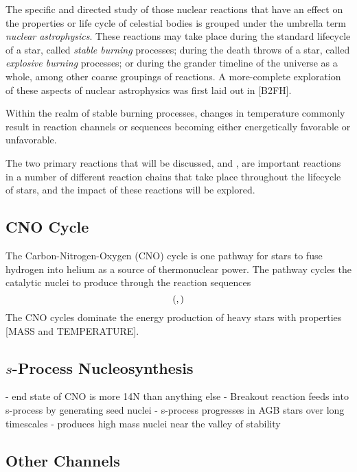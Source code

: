 

The specific and directed study of those nuclear reactions that have an effect
on the properties or life cycle of celestial bodies is grouped under the
umbrella term \emph{nuclear astrophysics}. These reactions may take place
during the standard lifecycle of a star, called \emph{stable burning}
processes; during the death throws of a star, called \emph{explosive burning}
processes; or during the grander timeline of the universe as a whole, among
other coarse groupings of reactions. A more-complete exploration of these
aspects of nuclear astrophysics was first laid out in [B2FH].

Within the realm of stable burning processes, changes in temperature commonly
result in reaction channels or sequences becoming either energetically
favorable or unfavorable.

The two primary reactions that will
be discussed, \alpa{} and ,
are important reactions in a number of different reaction chains that take
place throughout the lifecycle of stars, and the impact of these reactions will
be explored.

\subsection{CNO Cycle}

The Carbon-Nitrogen-Oxygen (CNO) cycle is one pathway for stars to fuse
hydrogen into helium as a source of thermonuclear power. The pathway cycles the
catalytic nuclei to produce  through the reaction sequences
\[
    (,)
\]
The CNO cycles dominate the energy production of heavy stars with properties
[MASS and TEMPERATURE].

\subsection{$s$-Process Nucleosynthesis}

- end state of CNO is more 14N than anything else
- Breakout reaction feeds into s-process by generating seed nuclei
- s-process progresses in AGB stars over long timescales
- produces high mass nuclei near the valley of stability

\subsection{Other Channels}

